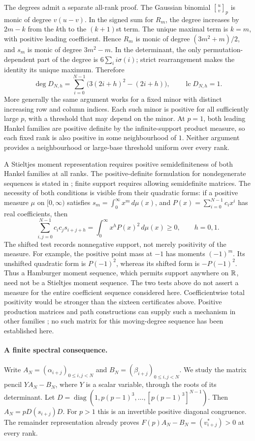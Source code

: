 \documentclass[11pt]{article}
\begin{document}
The degrees admit a separate all-rank proof. The Gaussian binomial
$\genfrac{[}{]}{0pt}{}{u}{v}_p$ is monic of degree $v(u-v)$. In the signed sum for $R_m$,
the degree increases by $2m-k$ from the $k$th to the $(k+1)$st term.
The unique maximal term is $k=m$, with positive leading coefficient.
Hence $R_m$ is monic of degree $(3m^2+m)/2$, and $s_m$ is monic of
degree $3m^2-m$. In the determinant, the only permutation-dependent
part of the degree is $6\sum_i i\sigma(i)$; strict rearrangement makes
the identity its unique maximum. Therefore
\[
 \deg D_{N,h}=\sum_{i=0}^{N-1}\bigl(3(2i+h)^2-(2i+h)\bigr),
 \qquad \operatorname{lc}D_{N,h}=1.
\]
More generally the same argument works for a fixed minor with distinct
increasing row and column indices. Each such minor is positive for all
sufficiently large $p$, with a threshold that may depend on the minor.
At $p=1$, both leading Hankel families are positive definite by the
infinite-support product measure, so each fixed rank is also positive in
some neighbourhood of $1$. Neither argument provides a neighbourhood or
large-base threshold uniform over every rank.

A Stieltjes moment representation requires positive semidefiniteness of
both Hankel families at all ranks. The positive-definite formulation
for nondegenerate sequences is stated in
\cite[Lemma~2.1, p.~4]{wangzhu2016}; finite support requires allowing
semidefinite matrices. The necessity of both conditions is visible
from their quadratic forms:
if a positive measure $\mu$ on $[0,\infty)$ satisfies
$s_m=\int_0^\infty x^m\,d\mu(x)$, and
$P(x)=\sum_{i=0}^{N-1}c_ix^i$ has real coefficients, then
\[
 \sum_{i,j=0}^{N-1}c_ic_j s_{i+j+h}
 =\int_0^\infty x^hP(x)^2\,d\mu(x)\ge0,
 \qquad h=0,1.
\]
The shifted test records nonnegative support, not merely positivity
of the measure. For example, the positive point mass at $-1$ has
moments $(-1)^m$. Its unshifted quadratic form is $P(-1)^2$, whereas
its shifted form is $-P(-1)^2$. Thus a Hamburger moment sequence,
which permits support anywhere on $\mathbb{R}$, need not be a Stieltjes
moment sequence. The two tests above do not assert a measure for the
entire coefficient sequence considered here.
Coefficientwise total positivity would be stronger than the sixteen
certificates above. Positive production matrices and path constructions
can supply such a mechanism in other families
\cite[Sec.~2]{lrz2017}\cite[Thms.~9.7--9.8]{psz2023}; no such matrix for
this moving-degree sequence has been established here.

\paragraph{A finite spectral consequence.}
Write $A_N=(\alpha_{i+j})_{0\le i,j<N}$ and
$B_N=(\beta_{i+j})_{0\le i,j<N}$. We study the matrix pencil
$YA_N-B_N$, where $Y$ is a scalar variable, through the roots of its
determinant.
Let $D=\operatorname{diag}(1,p(p-1)^3,\ldots,[p(p-1)^3]^{N-1})$.
Then $A_N=pD(s_{i+j})D$. For $p>1$ this is an invertible positive diagonal
congruence. The remainder representation already proves
$F(p)A_N-B_N=(v^*_{i+j})>0$ at every rank.
\end{document}
